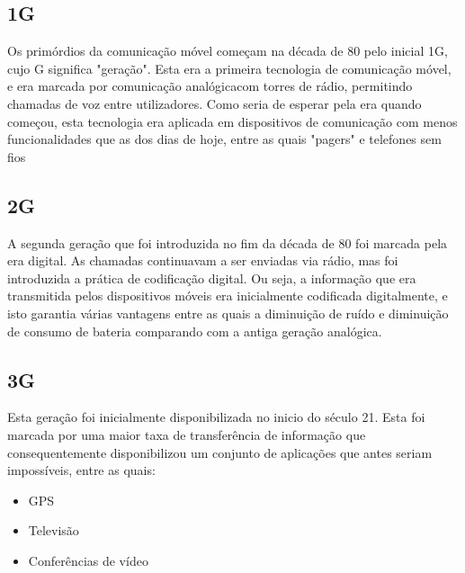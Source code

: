 \documentclass{llncs}
\begin{document}
\subsection{1G}
\hspace*{1.5em}Os primórdios da comunicação móvel começam na década de 80 pelo inicial 1G, cujo G significa "geração". Esta era a primeira tecnologia de comunicação móvel, e era marcada por comunicação analógica\cite{Ton:Pan:Kus}com torres de rádio, permitindo chamadas de voz entre utilizadores. Como seria de esperar pela era quando começou, esta tecnologia era aplicada em dispositivos de comunicação com menos funcionalidades que as dos dias de hoje, entre as quais "pagers" e telefones sem fios \cite{Ton:Pan:Kus}

\subsection{2G}
\hspace*{1.5em}A segunda geração que foi introduzida no fim da década de 80 \cite{Ton:Pan:Kus} foi marcada pela era digital. As chamadas continuavam a ser enviadas via rádio, mas foi introduzida a prática de codificação digital. Ou seja, a informação que era transmitida pelos dispositivos móveis era inicialmente codificada digitalmente, e isto garantia várias vantagens entre as quais a diminuição de ruído e diminuição de consumo de bateria comparando com a antiga geração analógica.

\subsection{3G}
\hspace*{1.5em}Esta geração foi inicialmente disponibilizada no inicio do século 21. Esta foi marcada por uma maior taxa de transferência de informação que consequentemente disponibilizou um conjunto de aplicações que antes seriam impossíveis, entre as quais:
\begin{itemize}
    \item GPS
    \item Televisão
    \item Conferências de vídeo
\end{itemize}
\end{document}
